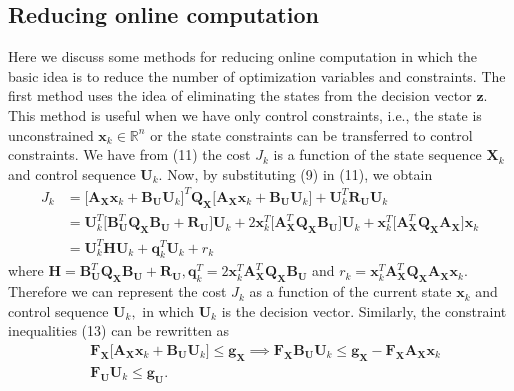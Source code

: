 \documentclass{article}
\begin{document}
\subsection{Reducing online computation}
Here we discuss some methods for reducing online computation in which the basic idea is to reduce the number of optimization variables and constraints. The first method uses the idea of eliminating the states from the decision vector $\textbf{z}$. This method is useful when we have only control constraints, i.e., the state is unconstrained $\textbf{x}_{k} \in \mathbb{R}^{n}$ or the state constraints can be transferred to control constraints. We have from (11) the cost $J_k$ is a function of the state sequence $\textbf{X}_{k}$ and control sequence $\textbf{U}_{k}.$ Now, by substituting (9) in (11), we obtain
\begin{equation}
\begin{aligned}
       J_{k}&= \big[\textbf{A}_{\textbf{X}}\textbf{x}_{k}+\textbf{B}_{\textbf{U}}\textbf{U}_{k}\big]^{T}\textbf{Q}_{\textbf{X}} \big[\textbf{A}_{\textbf{X}}\textbf{x}_{k}+\textbf{B}_{\textbf{U}}\textbf{U}_{k}\big]+\textbf{U}_{k}^{T}\textbf{R}_{\textbf{U}} \textbf{U}_{k}\\
       &=\textbf{U}_{k}^{T}\big[\textbf{B}_{\textbf{U}}^{T}\textbf{Q}_{\textbf{X}}\textbf{B}_{\textbf{U}}+\textbf{R}_{\textbf{U}}\big]\textbf{U}_{k}+2 \textbf{x}_{k}^{T}\big[\textbf{A}_{\textbf{X}}^{T}\textbf{Q}_{\textbf{X}}\textbf{B}_{\textbf{U}} \big]\textbf{U}_{k}+ \textbf{x}_{k}^{T}\big[\textbf{A}_{\textbf{X}}^{T}\textbf{Q}_{\textbf{X}}\textbf{A}_{\textbf{X}} \big]\textbf{x}_{k}\\
       &=\textbf{U}_{k}^{T}\textbf{H}\textbf{U}_{k}+ \textbf{q}_{k}^{T}\textbf{U}_{k}+{r}_{k}
\end{aligned}
\end{equation}
where $\textbf{H}=\textbf{B}_{\textbf{U}}^{T}\textbf{Q}_{\textbf{X}}\textbf{B}_{\textbf{U}}+\textbf{R}_{\textbf{U}}, \textbf{q}_{k}^{T}=2\textbf{x}_{k}^{T}\textbf{A}_{\textbf{X}}^{T}\textbf{Q}_{\textbf{X}}\textbf{B}_{\textbf{U}}$ and ${r}_{k}=\textbf{x}_{k}^{T}\textbf{A}_{\textbf{X}}^{T}\textbf{Q}_{\textbf{X}}\textbf{A}_{\textbf{X}}\textbf{x}_{k}.$ Therefore we can represent the cost $J_k$ as a function of the current state $\textbf{x}_{k}$ and control sequence $\textbf{U}_{k},$ in which $\textbf{U}_{k}$ is the decision vector. Similarly, the constraint inequalities (13) can be rewritten as 
\begin{equation}
    \begin{aligned}
     & \textbf{F}_{\textbf{X}}\big[\textbf{A}_{\textbf{X}}\textbf{x}_{k}+\textbf{B}_{\textbf{U}}\textbf{U}_{k}\big] \leq \textbf{g}_{\textbf{X}} \implies  \textbf{F}_{\textbf{X}}\textbf{B}_{\textbf{U}}\textbf{U}_{k} \leq \textbf{g}_{\textbf{X}}-\textbf{F}_{\textbf{X}}\textbf{A}_{\textbf{X}}\textbf{x}_{k}\\
     &\textbf{F}_{\textbf{U}}\textbf{U}_{k} \leq \textbf{g}_{\textbf{U}}.
    \end{aligned}
\end{equation}
\end{document}
